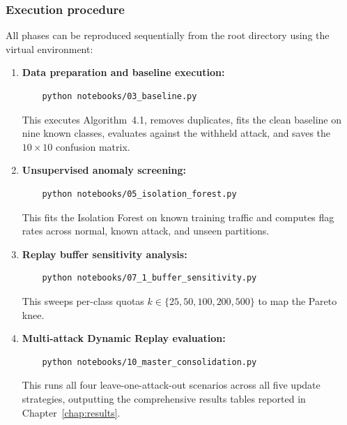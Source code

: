 \subsubsection{Execution procedure}
All phases can be reproduced sequentially from the root directory using the virtual environment:
\begin{enumerate}
    \item \textbf{Data preparation and baseline execution:}
    \begin{verbatim}
    python notebooks/03_baseline.py
    \end{verbatim}
    This executes Algorithm~4.1, removes duplicates, fits the clean baseline on nine known classes, evaluates against the withheld attack, and saves the $10 \times 10$ confusion matrix.
    \item \textbf{Unsupervised anomaly screening:}
    \begin{verbatim}
    python notebooks/05_isolation_forest.py
    \end{verbatim}
    This fits the Isolation Forest on known training traffic and computes flag rates across normal, known attack, and unseen partitions.
    \item \textbf{Replay buffer sensitivity analysis:}
    \begin{verbatim}
    python notebooks/07_1_buffer_sensitivity.py
    \end{verbatim}
    This sweeps per-class quotas $k \in \{25, 50, 100, 200, 500\}$ to map the Pareto knee.
    \item \textbf{Multi-attack Dynamic Replay evaluation:}
    \begin{verbatim}
    python notebooks/10_master_consolidation.py
    \end{verbatim}
    This runs all four leave-one-attack-out scenarios across all five update strategies, outputting the comprehensive results tables reported in Chapter~\ref{chap:results}.
\end{enumerate}

